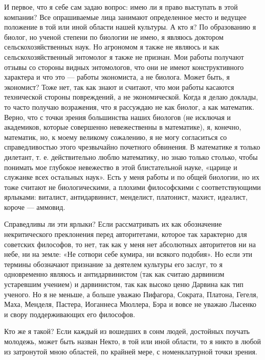 И первое, что я себе сам задаю вопрос: имею ли я право выступать в
этой компании? Все опрашиваемые лица занимают определенное место и
ведущее положение в той или иной области нашей культуры. А кто я? По
образованию я биолог, но ученой степени по биологии не имею, я являюсь
доктором сельскохозяйственных наук. Но агрономом я также не являюсь и
как сельскохозяйственный энтомолог я также не признан. Мои работы
получают отзывы со стороны видных энтомологов, что они не имеют
конструктивного характера и что это --- работы экономиста, а не
биолога. Может быть, я экономист? Тоже нет, так как знают и считают,
что мои работы касаются технической стороны повреждений, а не
экономической. Когда я делаю доклады, то часто получаю возражения, что
я рассуждаю не как биолог, а как математик. Верно, что с точки зрения
большинства наших биологов (не исключая и академиков, которые
совершенно невежественны в математике), я, конечно, математик, но, к
моему великому сожалению, я не могу согласиться со справедливостью
этого чрезвычайно почетного обвинения. В математике я только дилетант,
т. е. действительно люблю математику, но знаю только столько, чтобы
понимать мое глубокое невежество в этой блистательной науке, «царице и
служанке всех остальных наук». Есть у меня работы и по общей биологии,
но их тоже считают не биологическими, а плохими философскими с
соответствующими ярлыками: виталист, антидарвинист, менделист,
платонист, махист, идеалист, короче --- аммовид.

Справедливы ли эти ярлыки? Если рассматривать их как обозначение
некритического преклонения перед авторитетами, которое так характерно
для советских философов, то нет, так как у меня нет абсолютных
авторитетов ни на небе, ни на земле: «Не сотвори себе кумира, ни
всякого подобия». Но если эти термины обозначают признание за деятелем
культуры его заслуг, то я одновременно являюсь и антидарвинистом (так
как считаю дарвинизм устаревшим учением) и дарвинистом, так как высоко
ценю Дарвина как тип ученого. Но я не меньше, а больше уважаю
Пифагора, Сократа, Платона, Гегеля, Маха, Менделя, Пастера, Иоганнеса
Мюллера, Бэра и вовсе не уважаю Лысенко и свору поддерживающих его
философов.

Кто же я такой? Если каждый из вошедших в сонм людей, достойных
поучать молодежь, может быть назван Некто, в той или иной области, то
я никто в любой из затронутой мною областей, по крайней мере, с
номенклатурной точки зрения.

